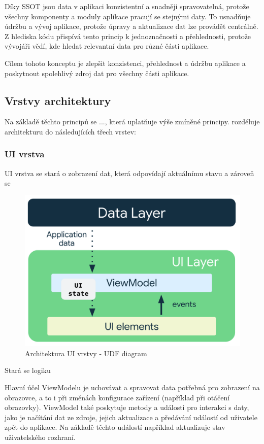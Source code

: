 Díky SSOT jsou data v aplikaci konzistentní a snadněji spravovatelná, protože všechny komponenty a moduly aplikace pracují se stejnými 
daty. To usnadňuje údržbu a vývoj aplikace, protože úpravy a aktualizace dat lze provádět centrálně. Z hlediska kódu přispívá tento
princip k jednoznačnosti a přehlednosti, protože vývojáři vědí, kde hledat relevantní data pro různé části aplikace.

Cílem tohoto konceptu je zlepšit konzistenci, přehlednost a údržbu aplikace a poskytnout spolehlivý zdroj dat pro všechny části aplikace.


\subsection{Vrstvy architektury} \label{vrstvyArchitekturySection} 

Na základě těchto principů se ..., která uplatňuje výše zmíněné principy.
rozděluje architekturu do následujících třech vrstev:

\subsubsection*{UI vrstva}
UI vrstva se stará o zobrazení dat, která odpovídají aktuálnímu stavu a zároveň se 

\begin{figure}[H]
  \centering
  \includegraphics[width=.5\textwidth]{arch-ui-udf.png}
  \caption{Architektura UI vrstvy - UDF diagram}
  \label{fig:arch_ui_udf}
\end{figure}

Stará se logiku


Hlavní účel ViewModelu je uchovávat a spravovat data potřebná pro zobrazení na obrazovce, a to i při změnách konfigurace zařízení 
(například při otáčení obrazovky). ViewModel také poskytuje metody a události pro interakci s daty, jako je načítání dat ze zdroje, 
jejich aktualizace a předávání událostí od uživatele zpět do aplikace. Na základě těchto událostí například aktualizuje stav uživatelského
rozhraní.

